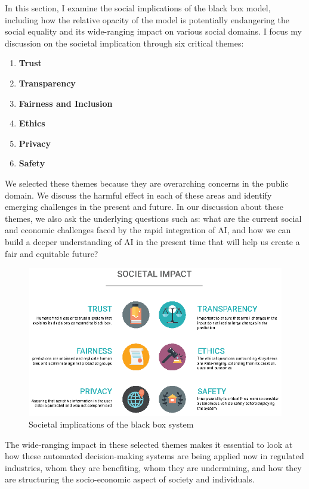 In this section, I examine the social implications of the black box model, including how the relative opacity of the model is potentially endangering the social equality and its wide-ranging impact on various social domains. I focus my discussion on the societal implication through six critical themes:

\begin{enumerate}
\item \textbf{Trust}
\item  \textbf{Transparency}
\item \textbf{Fairness and Inclusion}
\item \textbf{Ethics}
\item \textbf{Privacy}
\item \textbf{Safety}
\end{enumerate}

We selected these themes because they are overarching concerns in the public domain. We discuss the harmful effect in each of these areas and identify emerging challenges in the present and future. In our discussion about these themes, we also ask the underlying questions such as: what are the current social and economic challenges faced by the rapid integration of AI, and how we can build a deeper understanding of AI \cite{Solon2017} in the present time that will help us create a fair and equitable future?

\begin{figure}[htbp]
\centering
\includegraphics[width=1\textwidth]{images/societal-impact-copy.eps}
\caption{Societal implications of the black box system}
\label{fig:societal-impacts}
\end{figure}

The wide-ranging impact in these selected themes makes it essential to look at how these automated decision-making systems are being applied now in regulated industries, whom they are benefiting, whom they are undermining, and how they are structuring the socio-economic aspect of society and individuals\cite{ainow2016report}.

